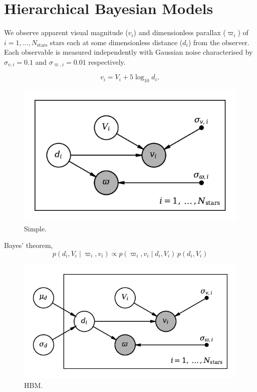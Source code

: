%
%
%
%
%
\chapter{Hierarchical Bayesian Models}

We observe apparent visual magnitude (\(v_i\)) and dimensionless parallax (\(\varpi_i\)) of \(i= 1,\dots,N_\mathrm{stars}\) stars each at some dimensionless distance (\(d_i\)) from the observer. Each observable is measured independently with Gaussian noise characterised by \(\sigma_{v,i} = 0.1\) and \(\sigma_{\varpi,i} = 0.01\) respectively.

%
\begin{equation}
    v_i = V_i + 5 \log_{10} d_i,
\end{equation}
%

\begin{figure}[!tb]
    \centering
    \includegraphics{figures/simple-pgm.pdf}
    \caption{Simple.}
\end{figure}

Bayes' theorem,
%
\begin{equation}
    p(d_i, V_i \mid \varpi_i, v_i) \propto p(\varpi_i, v_i \mid d_i, V_i) \, p(d_i, V_i)
\end{equation}
%

\begin{figure}[!tb]
    \centering
    \includegraphics{figures/hbm-pgm.pdf}
    \caption{HBM.}
\end{figure}

